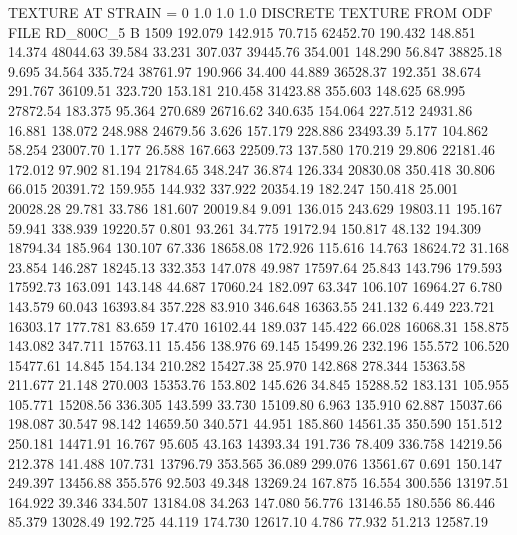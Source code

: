 TEXTURE AT STRAIN = 0
1.0   1.0   1.0
DISCRETE TEXTURE FROM ODF FILE RD_800C_5
B 1509
 192.079  142.915   70.715     62452.70
 190.432  148.851   14.374     48044.63
  39.584   33.231  307.037     39445.76
 354.001  148.290   56.847     38825.18
   9.695   34.564  335.724     38761.97
 190.966   34.400   44.889     36528.37
 192.351   38.674  291.767     36109.51
 323.720  153.181  210.458     31423.88
 355.603  148.625   68.995     27872.54
 183.375   95.364  270.689     26716.62
 340.635  154.064  227.512     24931.86
  16.881  138.072  248.988     24679.56
   3.626  157.179  228.886     23493.39
   5.177  104.862   58.254     23007.70
   1.177   26.588  167.663     22509.73
 137.580  170.219   29.806     22181.46
 172.012   97.902   81.194     21784.65
 348.247   36.874  126.334     20830.08
 350.418   30.806   66.015     20391.72
 159.955  144.932  337.922     20354.19
 182.247  150.418   25.001     20028.28
  29.781   33.786  181.607     20019.84
   9.091  136.015  243.629     19803.11
 195.167   59.941  338.939     19220.57
   0.801   93.261   34.775     19172.94
 150.817   48.132  194.309     18794.34
 185.964  130.107   67.336     18658.08
 172.926  115.616   14.763     18624.72
  31.168   23.854  146.287     18245.13
 332.353  147.078   49.987     17597.64
  25.843  143.796  179.593     17592.73
 163.091  143.148   44.687     17060.24
 182.097   63.347  106.107     16964.27
   6.780  143.579   60.043     16393.84
 357.228   83.910  346.648     16363.55
 241.132    6.449  223.721     16303.17
 177.781   83.659   17.470     16102.44
 189.037  145.422   66.028     16068.31
 158.875  143.082  347.711     15763.11
  15.456  138.976   69.145     15499.26
 232.196  155.572  106.520     15477.61
  14.845  154.134  210.282     15427.38
  25.970  142.868  278.344     15363.58
 211.677   21.148  270.003     15353.76
 153.802  145.626   34.845     15288.52
 183.131  105.955  105.771     15208.56
 336.305  143.599   33.730     15109.80
   6.963  135.910   62.887     15037.66
 198.087   30.547   98.142     14659.50
 340.571   44.951  185.860     14561.35
 350.590  151.512  250.181     14471.91
  16.767   95.605   43.163     14393.34
 191.736   78.409  336.758     14219.56
 212.378  141.488  107.731     13796.79
 353.565   36.089  299.076     13561.67
   0.691  150.147  249.397     13456.88
 355.576   92.503   49.348     13269.24
 167.875   16.554  300.556     13197.51
 164.922   39.346  334.507     13184.08
  34.263  147.080   56.776     13146.55
 180.556   86.446   85.379     13028.49
 192.725   44.119  174.730     12617.10
   4.786   77.932   51.213     12587.19
